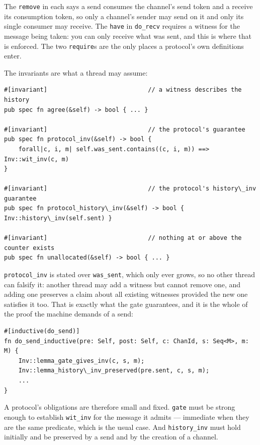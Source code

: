\documentclass[11pt]{article}
\newcommand{\code}[1]{\texttt{#1}}
\newcommand{\srcname}[1]{%
  \vspace{0.9em}\noindent{\sffamily\scriptsize\color{comment}\MakeUppercase{#1}}\par
  \vspace{-0.7em}}
\begin{document}
The \code{remove} in each says a send consumes the channel's send token and a
receive its consumption token, so only a channel's sender may send on it and
only its single consumer may receive. The \code{have} in \code{do\_recv}
requires a witness for the message being taken: you can only receive what was
sent, and this is where that is enforced. The two \code{require}s are the only
places a protocol's own definitions enter.

The invariants are what a thread may assume:

\srcname{src/tok.rs --- the invariants}
\begin{lstlisting}
#[invariant]                            // a witness describes the history
pub spec fn agree(&self) -> bool { ... }

#[invariant]                            // the protocol's guarantee
pub spec fn protocol_inv(&self) -> bool {
    forall|c, i, m| self.was_sent.contains((c, i, m)) ==> Inv::wit_inv(c, m)
}

#[invariant]                            // the protocol's history\_inv guarantee
pub spec fn protocol_history\_inv(&self) -> bool { Inv::history\_inv(self.sent) }

#[invariant]                            // nothing at or above the counter exists
pub spec fn unallocated(&self) -> bool { ... }
\end{lstlisting}

\code{protocol\_inv} is stated over \code{was\_sent}, which only ever grows, so
no other thread can falsify it: another thread may add a witness but cannot
remove one, and adding one preserves a claim about all existing witnesses
provided the new one satisfies it too. That is exactly what the gate guarantees,
and it is the whole of the proof the machine demands of a send:

\begin{lstlisting}
#[inductive(do_send)]
fn do_send_inductive(pre: Self, post: Self, c: ChanId, s: Seq<M>, m: M) {
    Inv::lemma_gate_gives_inv(c, s, m);
    Inv::lemma_history\_inv_preserved(pre.sent, c, s, m);
    ...
}
\end{lstlisting}

A protocol's obligations are therefore small and fixed. \code{gate} must be
strong enough to establish \code{wit\_inv} for the message it admits ---
immediate when they are the same predicate, which is the usual case. And
\code{history\_inv} must hold initially and be preserved by a send and by the creation
of a channel.
\end{document}
